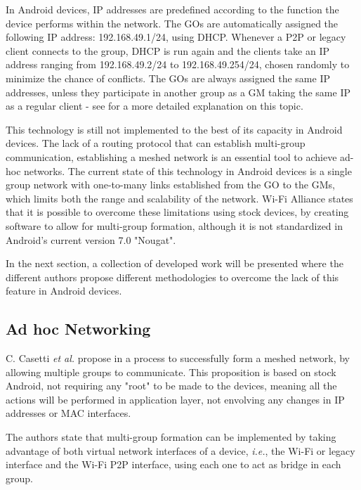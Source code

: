 In Android devices, \gls{IP} addresses are predefined according to the function the device performs within the network. The \glspl{GO} are automatically assigned the following \gls{IP} address: 192.168.49.1/24, using \gls{DHCP}. Whenever a P2P or legacy client connects to the group, \gls{DHCP} is run again and the clients take an \gls{IP} address ranging from 192.168.49.2/24 to 192.168.49.254/24, chosen randomly to minimize the chance of conflicts. The \glspl{GO} are always assigned the same \gls{IP} addresses, unless they participate in another group as a \gls{GM} taking the same \gls{IP} as a regular client - see \cite{routeMultiGroup} for a more detailed explanation on this topic.

This technology is still not implemented to the best of its capacity in Android devices. The lack of a routing protocol that can establish multi-group communication, establishing a meshed network is an essential tool to achieve ad-hoc networks. The current state of this technology in Android devices is a single group network with one-to-many links established from the \gls{GO} to the \glspl{GM}, which limits both the range and scalability of the network. Wi-Fi Alliance states that it is possible to overcome these limitations using stock devices, by creating software to allow for multi-group formation, although it is not standardized in Android's current version 7.0 "Nougat".

In the next section, a collection of developed work will be presented where the different authors propose different methodologies to overcome the lack of this feature in Android devices.

\subsection{Ad hoc Networking}
\label{subsection:adhocnet}

C. Casetti \textit{et al.} propose in \cite{routeMultiGroup} a process to successfully form a meshed network, by allowing multiple groups to communicate. This proposition is based on stock Android, not requiring any "root" to be made to the devices, meaning all the actions will be performed in application layer, not envolving any changes in \gls{IP} addresses or \gls{MAC} interfaces.

The authors state that multi-group formation can be implemented by taking advantage of both virtual network interfaces of a device, \textit{i.e.}, the Wi-Fi or legacy interface and the Wi-Fi P2P interface, using each one to act as bridge in each group.

